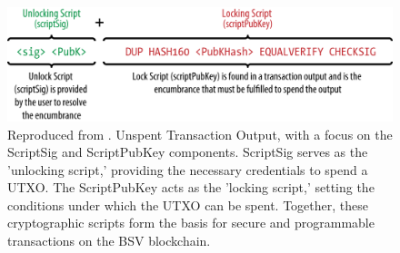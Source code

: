 \begin{figure}
    \centering
    \includegraphics[width=\textwidth]{images/chapter-2/utxo.png}
    \caption[Unspent Transaction Output]{Reproduced from \citep{antonopoulos2014mastering}. Unspent Transaction Output, with a focus on the ScriptSig and ScriptPubKey components. ScriptSig serves as the 'unlocking script,' providing the necessary credentials to spend a UTXO. The ScriptPubKey acts as the 'locking script,' setting the conditions under which the UTXO can be spent. Together, these cryptographic scripts form the basis for secure and programmable transactions on the BSV blockchain.}
    \label{fig:utxo}
\end{figure}


